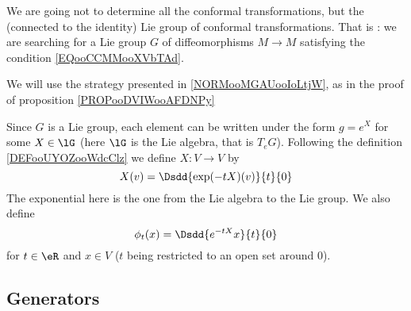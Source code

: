 \begin{remark}
    We are going not to determine all the conformal transformations, but the (connected to the identity) Lie group of conformal transformations. That is : we are searching for a Lie group \( G\) of diffeomorphisms \( M\to M\) satisfying the condition \eqref{EQooCCMMooXVbTAd}.
\end{remark}

We will use the strategy presented in \ref{NORMooMGAUooIoLtjW}, as in the proof of proposition \ref{PROPooDVIWooAFDNPy}

Since \( G\) is a Lie group, each element can be written under the form \( g= e^{X}\) for some \( X\in\lG\) (here \( \lG\) is the Lie algebra, that is \( T_eG\)). Following the definition \ref{DEFooUYOZooWdcClz} we define \( X\colon V\to V\) by
\begin{equation}
    X(v)=\Dsdd{  \exp(-tX)(v) }{t}{0}
\end{equation}
The exponential here is the one from the Lie algebra to the Lie group. We also define
\begin{equation}
    \phi_t(x)=\Dsdd{  e^{-tX}x }{t}{0}
\end{equation}
for \( t\in \eR\) and \( x\in V\) (\( t\) being restricted to an open set around \( 0\)). 

\subsection{Generators}

